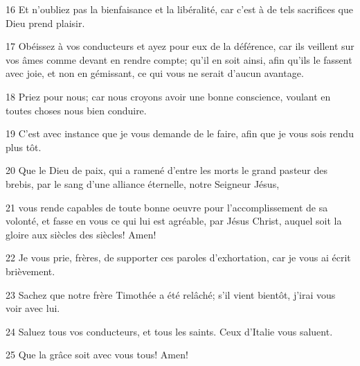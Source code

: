 \par 16 Et n'oubliez pas la bienfaisance et la libéralité, car c'est à de tels sacrifices que Dieu prend plaisir.
\par 17 Obéissez à vos conducteurs et ayez pour eux de la déférence, car ils veillent sur vos âmes comme devant en rendre compte; qu'il en soit ainsi, afin qu'ils le fassent avec joie, et non en gémissant, ce qui vous ne serait d'aucun avantage.
\par 18 Priez pour nous; car nous croyons avoir une bonne conscience, voulant en toutes choses nous bien conduire.
\par 19 C'est avec instance que je vous demande de le faire, afin que je vous sois rendu plus tôt.
\par 20 Que le Dieu de paix, qui a ramené d'entre les morts le grand pasteur des brebis, par le sang d'une alliance éternelle, notre Seigneur Jésus,
\par 21 vous rende capables de toute bonne oeuvre pour l'accomplissement de sa volonté, et fasse en vous ce qui lui est agréable, par Jésus Christ, auquel soit la gloire aux siècles des siècles! Amen!
\par 22 Je vous prie, frères, de supporter ces paroles d'exhortation, car je vous ai écrit brièvement.
\par 23 Sachez que notre frère Timothée a été relâché; s'il vient bientôt, j'irai vous voir avec lui.
\par 24 Saluez tous vos conducteurs, et tous les saints. Ceux d'Italie vous saluent.
\par 25 Que la grâce soit avec vous tous! Amen!


